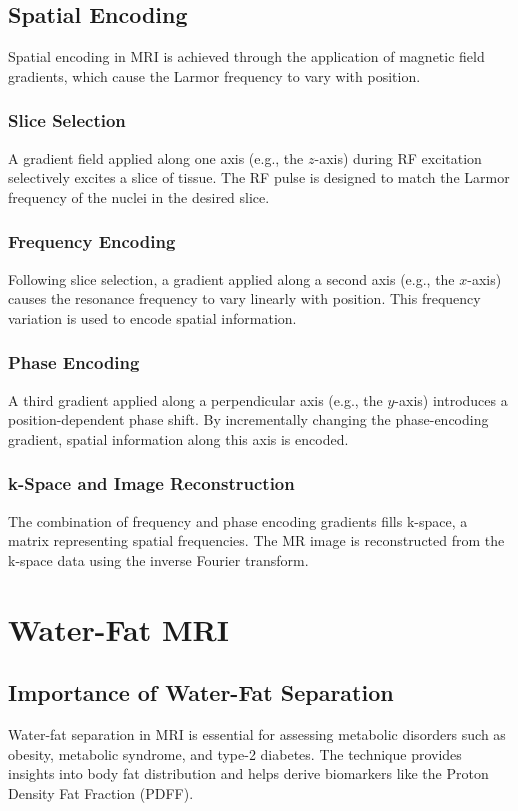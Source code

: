 \section{Spatial Encoding}
Spatial encoding in MRI is achieved through the application of magnetic field gradients, which cause the Larmor frequency to vary with position.

\subsection{Slice Selection}
A gradient field applied along one axis (e.g., the $z$-axis) during RF excitation selectively excites a slice of tissue. The RF pulse is designed to match the Larmor frequency of the nuclei in the desired slice.

\subsection{Frequency Encoding}
Following slice selection, a gradient applied along a second axis (e.g., the $x$-axis) causes the resonance frequency to vary linearly with position. This frequency variation is used to encode spatial information.

\subsection{Phase Encoding}
A third gradient applied along a perpendicular axis (e.g., the $y$-axis) introduces a position-dependent phase shift. By incrementally changing the phase-encoding gradient, spatial information along this axis is encoded.

\subsection{k-Space and Image Reconstruction}
The combination of frequency and phase encoding gradients fills k-space, a matrix representing spatial frequencies. The MR image is reconstructed from the k-space data using the inverse Fourier transform.

\chapter{Water-Fat MRI}

\section{Importance of Water-Fat Separation}
Water-fat separation in MRI is essential for assessing metabolic disorders such as obesity, metabolic syndrome, and type-2 diabetes. The technique provides insights into body fat distribution and helps derive biomarkers like the Proton Density Fat Fraction (PDFF).


